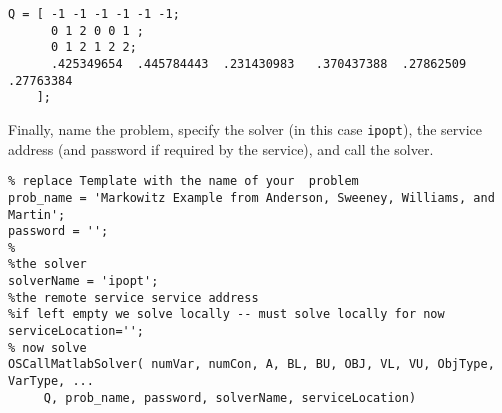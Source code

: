 \begin{verbatim}
Q = [ -1 -1 -1 -1 -1 -1;
      0 1 2 0 0 1 ;
      0 1 2 1 2 2;
      .425349654  .445784443  .231430983   .370437388  .27862509   .27763384
    ];
\end{verbatim}


Finally, name the problem, specify the solver (in this case {\tt ipopt}), the service address (and password if required by the service), and call the solver.



\begin{verbatim}
% replace Template with the name of your  problem
prob_name = 'Markowitz Example from Anderson, Sweeney, Williams, and Martin';
password = '';
%
%the solver
solverName = 'ipopt';
%the remote service service address
%if left empty we solve locally -- must solve locally for now
serviceLocation='';
% now solve
OSCallMatlabSolver( numVar, numCon, A, BL, BU, OBJ, VL, VU, ObjType, VarType, ...
     Q, prob_name, password, solverName, serviceLocation)
\end{verbatim}

\fi

